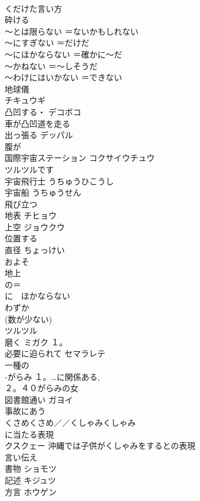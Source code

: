 \documentclass[8pt]{extreport}
\begin{document}
\begin{CJK}{UTF8}{min}
\\	くだけた言い方	
\\	砕ける 
\\	〜とは限らない	＝ないかもしれない 
\\	〜にすぎない	＝だけだ 
\\	〜にほかならない	＝確かに〜だ 
\\	〜かねない	＝〜しそうだ 
\\	〜わけにはいかない	＝できない 
\\	地球儀	
\\	チキュウギ
\\	凸凹する・	デコボコ 
\\	車が凸凹道を走る
\\	出っ張る	デッパル 
\\	腹が 
\\	国際宇宙ステーション	コクサイウチュウ 
\\	ツルツルです	
\\	宇宙飛行士	うちゅうひこうし 
\\	宇宙船	うちゅうせん 
\\	飛び立つ	
\\	地表	チヒョウ 
\\	上空	ジョウクウ 
\\	位置する	
\\	直径	ちょっけい 
\\	およそ	
\\	地上	
\\	の＝
\\	に　ほかならない	
\\	わずか	
\\	(数が少ない)
\\	ツルツル	
\\	磨く	ミガク １。
\\	必要に迫られて	セマラレテ 
\\	一種の	
\\	-がらみ	１。…に関係ある, 
\\	２。４０がらみの女 
\\	図書館通い	ガヨイ
\\	事故にあう	
\\	くさめくさめ／／くしゃみくしゃみ	
\\	に当たる表現
\\	クスクェー	沖縄では子供がくしゃみをするとの表現
\\	言い伝え	
\\	書物	ショモツ 
\\	記述	キジュツ 
\\	方言	ホウゲン 

\end{CJK}
\end{document}
